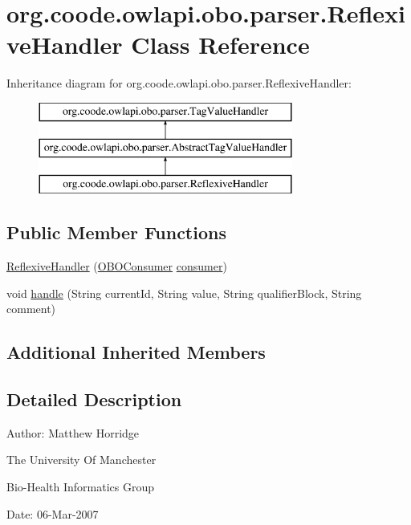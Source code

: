 \hypertarget{classorg_1_1coode_1_1owlapi_1_1obo_1_1parser_1_1_reflexive_handler}{\section{org.\-coode.\-owlapi.\-obo.\-parser.\-Reflexive\-Handler Class Reference}
\label{classorg_1_1coode_1_1owlapi_1_1obo_1_1parser_1_1_reflexive_handler}
}
Inheritance diagram for org.\-coode.\-owlapi.\-obo.\-parser.\-Reflexive\-Handler\-:\begin{figure}[H]
\begin{center}
\leavevmode
\includegraphics[height=3.000000cm]{classorg_1_1coode_1_1owlapi_1_1obo_1_1parser_1_1_reflexive_handler}
\end{center}
\end{figure}
\subsection*{Public Member Functions}
\begin{DoxyCompactItemize}
\item 
\hyperlink{classorg_1_1coode_1_1owlapi_1_1obo_1_1parser_1_1_reflexive_handler_ab6d95ee69d47629d360ddf0fb30d17e3}{Reflexive\-Handler} (\hyperlink{classorg_1_1coode_1_1owlapi_1_1obo_1_1parser_1_1_o_b_o_consumer}{O\-B\-O\-Consumer} \hyperlink{classorg_1_1coode_1_1owlapi_1_1obo_1_1parser_1_1_abstract_tag_value_handler_ab27f1ff22d15640c5f81585f18265137}{consumer})
\item 
void \hyperlink{classorg_1_1coode_1_1owlapi_1_1obo_1_1parser_1_1_reflexive_handler_a7237018242f888e3695d75aa829d6111}{handle} (String current\-Id, String value, String qualifier\-Block, String comment)
\end{DoxyCompactItemize}
\subsection*{Additional Inherited Members}


\subsection{Detailed Description}
Author\-: Matthew Horridge\par
 The University Of Manchester\par
 Bio-\/\-Health Informatics Group\par
 Date\-: 06-\/\-Mar-\/2007\par
\par
 

